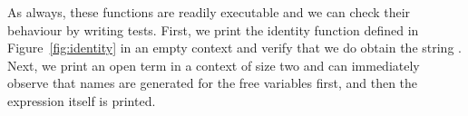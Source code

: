 
As always, these functions are readily executable and we can check
their behaviour by writing tests. First, we print the identity function
defined in Figure~\ref{fig:identity}
in an empty context and verify that we do obtain the string .
Next, we print an open term in a context of size two and can immediately
observe that names are generated for the free variables first, and then the
expression itself is printed.

\begin{minipage}{0.45\textwidth}
\end{minipage}
\begin{minipage}{0.45\textwidth}
\end{minipage}
